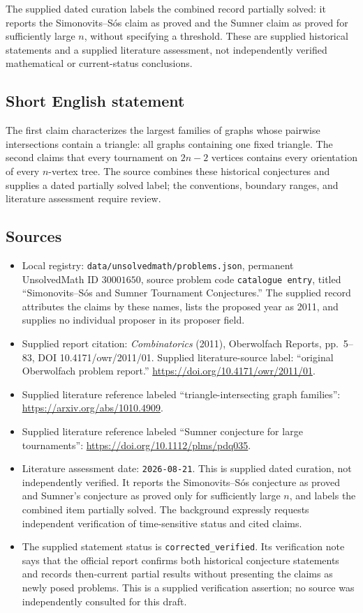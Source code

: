 \documentclass[11pt]{article}
\begin{document}
The supplied dated curation labels the combined record partially solved: it reports the Simonovits--S\'os claim as proved and the Sumner claim as proved for sufficiently large \(n\), without specifying a threshold. These are supplied historical statements and a supplied literature assessment, not independently verified mathematical or current-status conclusions.
\subsection{Short English statement}
The first claim characterizes the largest families of graphs whose pairwise intersections contain a triangle: all graphs containing one fixed triangle. The second claims that every tournament on \(2n-2\) vertices contains every orientation of every \(n\)-vertex tree. The source combines these historical conjectures and supplies a dated partially solved label; the conventions, boundary ranges, and literature assessment require review.
\subsection{Sources}
\begin{itemize}
\item Local registry: \texttt{data/unsolvedmath/problems.json}, permanent UnsolvedMath ID \(30001650\), source problem code \texttt{catalogue entry}, titled ``Simonovits--S\'os and Sumner Tournament Conjectures.'' The supplied record attributes the claims by these names, lists the proposed year as 2011, and supplies no individual proposer in its proposer field.
\item Supplied report citation: \emph{Combinatorics} (2011), Oberwolfach Reports, pp.\ 5--83, DOI 10.4171/owr/2011/01. Supplied literature-source label: ``original Oberwolfach problem report.'' \url{https://doi.org/10.4171/owr/2011/01}.
\item Supplied literature reference labeled ``triangle-intersecting graph families'': \url{https://arxiv.org/abs/1010.4909}.
\item Supplied literature reference labeled ``Sumner conjecture for large tournaments'': \url{https://doi.org/10.1112/plms/pdq035}.
\item Literature assessment date: \texttt{2026-08-21}. This is supplied dated curation, not independently verified. It reports the Simonovits--S\'os conjecture as proved and Sumner's conjecture as proved only for sufficiently large \(n\), and labels the combined item partially solved. The background expressly requests independent verification of time-sensitive status and cited claims.
\item The supplied statement status is \texttt{corrected\_verified}. Its verification note says that the official report confirms both historical conjecture statements and records then-current partial results without presenting the claims as newly posed problems. This is a supplied verification assertion; no source was independently consulted for this draft.
\end{itemize}
\end{document}
